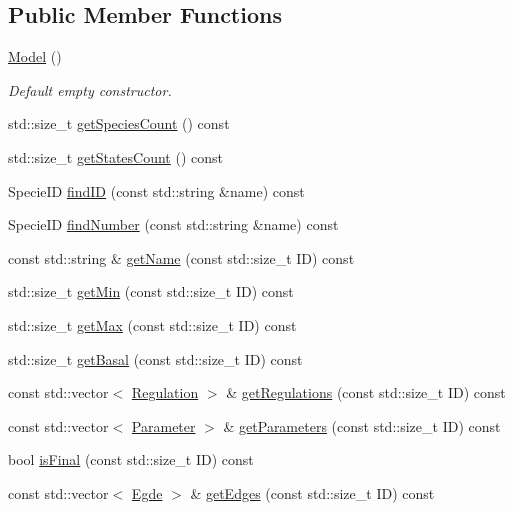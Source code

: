\subsection*{\-Public \-Member \-Functions}
\begin{DoxyCompactItemize}
\item 
\hypertarget{classModel_ae3b375de5f6df4faf74a95d64748e048}{\hyperlink{classModel_ae3b375de5f6df4faf74a95d64748e048}{\-Model} ()}\label{classModel_ae3b375de5f6df4faf74a95d64748e048}

\begin{DoxyCompactList}\small\item\em \-Default empty constructor. \end{DoxyCompactList}\item 
std\-::size\-\_\-t \hyperlink{classModel_a31711d4597a1bcf090360bd6872cb048}{get\-Species\-Count} () const 
\item 
std\-::size\-\_\-t \hyperlink{classModel_aec5d5dd02fb170cd82ade21efda8ce39}{get\-States\-Count} () const 
\item 
\-Specie\-I\-D \hyperlink{classModel_a9459ce72805c7027e2d46263eca05424}{find\-I\-D} (const std\-::string \&name) const 
\item 
\-Specie\-I\-D \hyperlink{classModel_aa6acfd6cc4b416cdfdc402c8d0cffc44}{find\-Number} (const std\-::string \&name) const 
\item 
const std\-::string \& \hyperlink{classModel_a80f0c690cc256c060b235e3a8ba819a1}{get\-Name} (const std\-::size\-\_\-t \-I\-D) const 
\item 
std\-::size\-\_\-t \hyperlink{classModel_ab2215aa132f2c45e4c269d80c0e7bc5b}{get\-Min} (const std\-::size\-\_\-t \-I\-D) const 
\item 
std\-::size\-\_\-t \hyperlink{classModel_ae8b6f6313995b3bef5fc193b2aa4e48e}{get\-Max} (const std\-::size\-\_\-t \-I\-D) const 
\item 
std\-::size\-\_\-t \hyperlink{classModel_a77c551052d785251ab87291c084cc722}{get\-Basal} (const std\-::size\-\_\-t \-I\-D) const 
\item 
const std\-::vector$<$ \hyperlink{structModel_1_1Regulation}{\-Regulation} $>$ \& \hyperlink{classModel_af9cab24dce8973a2e9e510eae848cbd9}{get\-Regulations} (const std\-::size\-\_\-t \-I\-D) const 
\item 
const std\-::vector$<$ \hyperlink{classModel_a68b6cea215bd8221cc6f8de2a187b4b4}{\-Parameter} $>$ \& \hyperlink{classModel_a044064e89c7b62fd7d11a6fb26ce625d}{get\-Parameters} (const std\-::size\-\_\-t \-I\-D) const 
\item 
bool \hyperlink{classModel_ab14643d4a2af377f639d02b4c45ad486}{is\-Final} (const std\-::size\-\_\-t \-I\-D) const 
\item 
const std\-::vector$<$ \hyperlink{classModel_a20d1a8ad1917da40f12e7ceb1f87d707}{\-Egde} $>$ \& \hyperlink{classModel_abb52df1a8ca9abfddf430f43d2b674d7}{get\-Edges} (const std\-::size\-\_\-t \-I\-D) const 
\end{DoxyCompactItemize}
